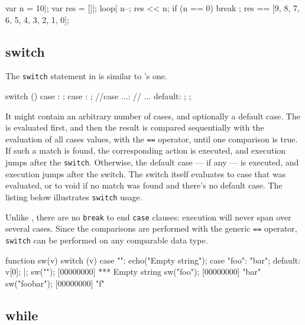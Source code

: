 \begin{urbiassert}[firstnumber=last]
{
  var n = 10|;
  var res = []|;
  loop|
  {
    n--;
    res << n;
    if (n == 0)
      break
  };
  res
}
==
[9, 8, 7, 6, 5, 4, 3, 2, 1, 0];
\end{urbiassert}

\subsection{switch}

The \lstinline|switch| statement in \us is similar to \C's one.

\begin{urbiunchecked}
switch ()
{
  case :
    ;
  case :
    ;
//case ...:
//  ...
  default:
    ;
};
\end{urbiunchecked}

It might contain an arbitrary number of cases, and optionally a
default case. The  is evaluated first, and then the
result is compared sequentially with the evaluation of all cases
values, with the \lstinline|==| operator, until one comparison is
true. If such a match is found, the corresponding action is executed,
and execution jumps after the \lstinline|switch|. Otherwise, the
default case --- if any --- is executed, and execution jumps after the
switch. The switch itself evaluates to case that was evaluated, or to
void if no match was found and there's no default case. The listing below
illustrates \lstinline|switch| usage.

Unlike \C, there are no \lstinline|break| to end \lstinline|case|
clauses: execution will never span over several cases.  Since the
comparisons are performed with the generic \lstinline|==| operator,
\lstinline|switch| can be performed on any comparable data type.

\begin{urbiscript}[firstnumber=last]
function sw(v)
{
  switch (v)
  {
    case "":
      echo("Empty string");
    case "foo":
      "bar";
    default:
      v[0];
  }
}|;
sw("");
[00000000] *** Empty string
sw("foo");
[00000000] "bar"
sw("foobar");
[00000000] "f"
\end{urbiscript}

\subsection{while}

